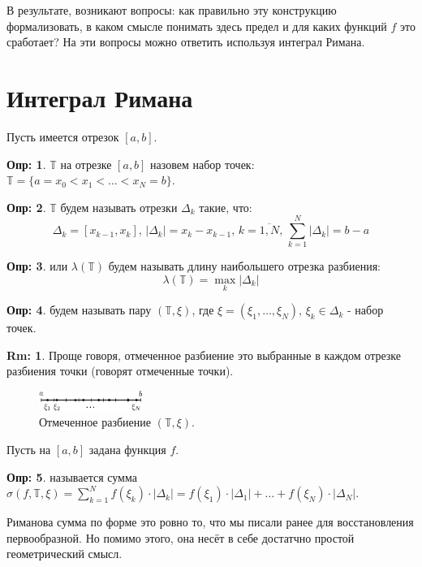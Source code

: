 \documentclass[12pt]{article}
\newcommand{\MTB}{\mathbb{T}}
\theoremstyle{definition}
\newtheorem{defn}{Опр:}
\newtheorem{rem}{Rm:}
\begin{document}
В результате, возникают вопросы: как правильно эту конструкцию формализовать, в каком смысле понимать здесь предел и для каких функций $f$ это сработает? На эти вопросы можно ответить используя интеграл Римана.

\section*{Интеграл Римана}
Пусть имеется отрезок $[a,b]$.
\begin{defn}
	 $\MTB$ на отрезке $[a,b]$ назовем набор точек: $\MTB = \{a = x_0 < x_1 < \dotsc < x_N = b\}$.
\end{defn}
\begin{defn}
	 $\MTB$ будем называть отрезки $\Delta_k$ такие, что: $$
		\Delta_k = [x_{k-1}, x_k], \, |\Delta_k| = x_k - x_{k-1}, \, k = \overline{1,N},\, \sum\limits_{k = 1}^N |\Delta_k| =  b - a
	$$
\end{defn}
\begin{defn}
	 или  $\lambda(\MTB)$ будем называть длину наибольшего отрезка разбиения:
	$$
		\lambda(\MTB) = \max\limits_{k}|\Delta_k|
	$$
\end{defn}
\begin{defn}
	 будем называть пару $(\MTB,\xi)$, где $\xi = (\xi_1,\dotsc, \xi_N), \, \xi_k \in \Delta_k$ - набор точек.
\end{defn}
\begin{rem}
	Проще говоря, отмеченное разбиение это выбранные в каждом отрезке разбиения точки (говорят отмеченные точки).
\end{rem}
\begin{figure}[H]
	\centering
	\includegraphics[width=0.3\textwidth]{21_2.eps}
	\caption{Отмеченное разбиение $(\MTB, \xi)$.}
	\label{21_2}
\end{figure}
Пусть на $[a,b]$ задана функция $f$.
\begin{defn}
	 называется сумма $\sigma(f, \MTB, \xi) = \displaystyle \sum\limits_{k = 1}^{N}f(\xi_k){\cdot}|\Delta_k| = f(\xi_1){\cdot}|\Delta_1| + \dotsc + f(\xi_N){\cdot}|\Delta_N|$.
\end{defn}
Риманова сумма по форме это ровно то, что мы писали ранее для восстановления первообразной. Но помимо этого, она несёт в себе достатчно простой геометрический смысл.
\end{document}

